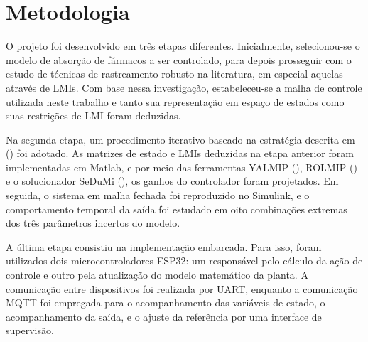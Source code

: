 \section{Metodologia}
\label{sec:metodologia}

O projeto foi desenvolvido em três etapas diferentes. Inicialmente, selecionou-se o modelo de absorção de fármacos a ser controlado, para depois prosseguir com o estudo de técnicas de rastreamento robusto na literatura, em especial aquelas através de LMIs. Com base nessa investigação, estabeleceu-se a malha de controle utilizada neste trabalho e tanto sua representação em espaço de estados como suas restrições de LMI foram deduzidas.

Na segunda etapa, um procedimento iterativo baseado na estratégia descrita em (\cite{morais_reference}) foi adotado. 
As matrizes de estado e LMIs deduzidas na etapa anterior foram implementadas em Matlab, e por meio das ferramentas YALMIP (\cite{lofberg2004yalmip}), ROLMIP (\cite{agulhari2019rolmip}) e o solucionador SeDuMi (\cite{sturm1999sedumi}), os ganhos do controlador foram projetados. Em seguida, o sistema em malha fechada foi reproduzido no Simulink, e o comportamento temporal da saída foi estudado em oito combinações extremas dos três parâmetros incertos do modelo.

A última etapa consistiu na implementação embarcada. Para isso, foram utilizados dois microcontroladores ESP32: um responsável pelo cálculo da ação de controle e outro pela atualização do modelo matemático da planta. A comunicação entre dispositivos foi realizada por UART, enquanto a comunicação MQTT foi empregada para o acompanhamento das variáveis de estado, o acompanhamento da saída, e o ajuste da referência por uma interface de supervisão.

\newpage
